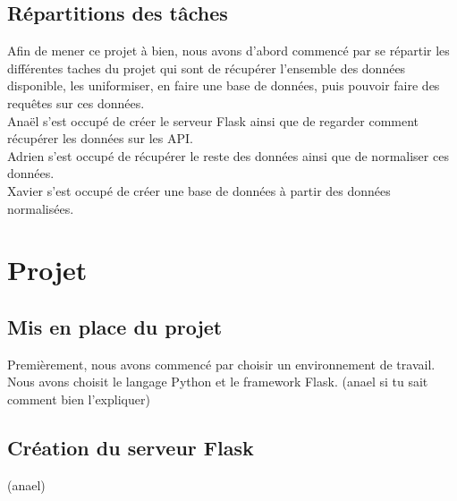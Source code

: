 \documentclass{article}
\begin{document}
\subsection{Répartitions des tâches}
Afin de mener ce projet à bien, nous avons d'abord commencé par se répartir les différentes taches du projet qui sont de récupérer l'ensemble des données disponible, les uniformiser, en faire une base de données, puis pouvoir faire des requêtes sur ces données.\\
Anaël s'est occupé de créer le serveur Flask ainsi que de regarder comment récupérer les données sur les API.\\
Adrien s'est occupé de récupérer le reste des données ainsi que de normaliser ces données.\\
Xavier s'est occupé de créer une base de données à partir des données normalisées.

\newpage

\section{Projet}

\subsection{Mis en place du projet}
Premièrement, nous avons commencé par choisir un environnement de travail.\\
Nous avons choisit le langage Python et le framework Flask. (anael si tu sait comment bien l'expliquer)

\subsection{Création du serveur Flask}
(anael)
\end{document}
